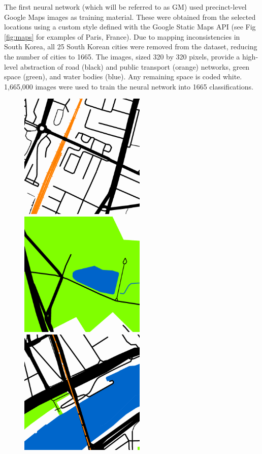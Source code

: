 \documentclass[10pt,letterpaper]{article}
\begin{document}
The first neural network (which will be referred to as GM) used precinct-level Google Maps images as training material. These were obtained from the selected locations using a custom style defined with the Google Static Maps API \cite{GoogleStatic2017} (see Fig \ref{fig:maps} for examples of Paris, France). Due to mapping inconsistencies in South Korea, all 25 South Korean cities were removed from the dataset, reducing the number of cities to 1665. The images, sized 320 by 320 pixels, provide a high-level abstraction of road (black) and public transport (orange) networks, green space (green), and water bodies (blue). Any remaining space is coded white. 1,665,000 images were used to train the neural network into 1665 classifications.

\begin{figure}[!htbp]
    \centering    
\includegraphics[scale=1]{Images/Map1.png} 
\includegraphics[scale=1]{Images/Map2.png} 
\includegraphics[scale=1]{Images/Map3.png} 

\end{figure}
\end{document}
